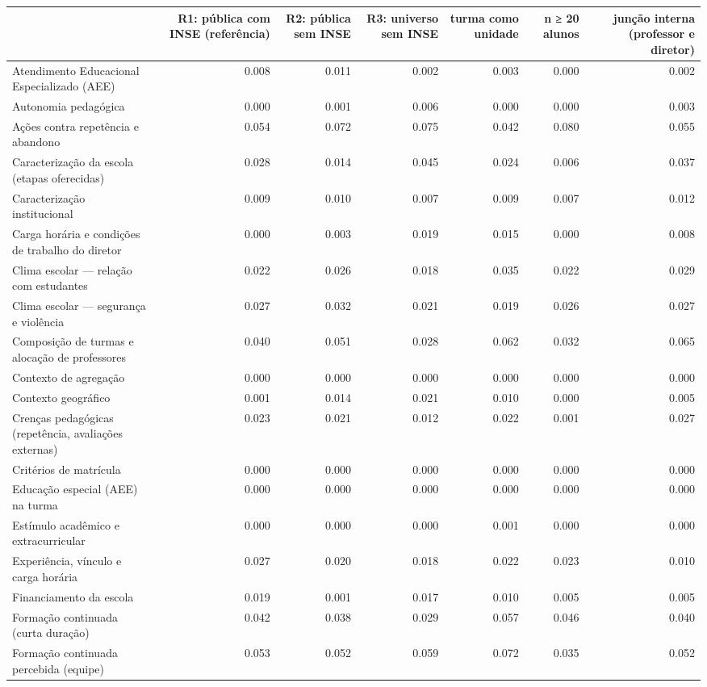 \begin{tabular}{lrrrrrr}
\toprule
 & R1: pública com INSE (referência) & R2: pública sem INSE & R3: universo sem INSE & turma como unidade & n ≥ 20 alunos & junção interna (professor e diretor) \\
\midrule
Atendimento Educacional Especializado (AEE) & 0.008 & 0.011 & 0.002 & 0.003 & 0.000 & 0.002 \\
Autonomia pedagógica & 0.000 & 0.001 & 0.006 & 0.000 & 0.000 & 0.003 \\
Ações contra repetência e abandono & 0.054 & 0.072 & 0.075 & 0.042 & 0.080 & 0.055 \\
Caracterização da escola (etapas oferecidas) & 0.028 & 0.014 & 0.045 & 0.024 & 0.006 & 0.037 \\
Caracterização institucional & 0.009 & 0.010 & 0.007 & 0.009 & 0.007 & 0.012 \\
Carga horária e condições de trabalho do diretor & 0.000 & 0.003 & 0.019 & 0.015 & 0.000 & 0.008 \\
Clima escolar — relação com estudantes & 0.022 & 0.026 & 0.018 & 0.035 & 0.022 & 0.029 \\
Clima escolar — segurança e violência & 0.027 & 0.032 & 0.021 & 0.019 & 0.026 & 0.027 \\
Composição de turmas e alocação de professores & 0.040 & 0.051 & 0.028 & 0.062 & 0.032 & 0.065 \\
Contexto de agregação & 0.000 & 0.000 & 0.000 & 0.000 & 0.000 & 0.000 \\
Contexto geográfico & 0.001 & 0.014 & 0.021 & 0.010 & 0.000 & 0.005 \\
Crenças pedagógicas (repetência, avaliações externas) & 0.023 & 0.021 & 0.012 & 0.022 & 0.001 & 0.027 \\
Critérios de matrícula & 0.000 & 0.000 & 0.000 & 0.000 & 0.000 & 0.000 \\
Educação especial (AEE) na turma & 0.000 & 0.000 & 0.000 & 0.000 & 0.000 & 0.000 \\
Estímulo acadêmico e extracurricular & 0.000 & 0.000 & 0.000 & 0.001 & 0.000 & 0.000 \\
Experiência, vínculo e carga horária & 0.027 & 0.020 & 0.018 & 0.022 & 0.023 & 0.010 \\
Financiamento da escola & 0.019 & 0.001 & 0.017 & 0.010 & 0.005 & 0.005 \\
Formação continuada (curta duração) & 0.042 & 0.038 & 0.029 & 0.057 & 0.046 & 0.040 \\
Formação continuada percebida (equipe) & 0.053 & 0.052 & 0.059 & 0.072 & 0.035 & 0.052 \\

\end{tabular}
